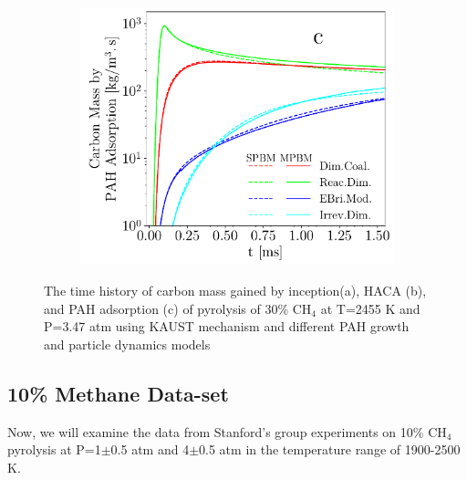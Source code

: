 \begin{figure}[H]
	\begin{subfigure}[t]{0.32\textwidth}
		\includegraphics[width=1\textwidth]{Figures/Results/Shocktube/Stanford/June/stsh_single_PAH.pdf}
	\end{subfigure}
	\caption{The time history of carbon mass gained by inception(a), HACA (b), and PAH adsorption (c) of pyrolysis of 30\% $\mathrm{CH_4}$ at T=2455 K and P=3.47 atm using KAUST mechanism and different PAH growth and particle dynamics models}
	\label{fig:shocktubecarbon} 
\end{figure}


%
%

\subsection{10\% Methane Data-set}

Now, we will examine the data from Stanford's group experiments on 10\% $\mathrm{CH_4}$ pyrolysis at P=1$\pm$0.5 atm and 4$\pm$0.5 atm in the temperature range of 1900-2500 K.


